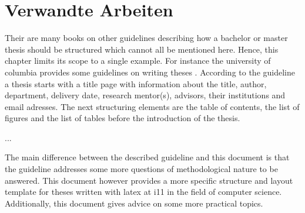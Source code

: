 
\chapter{Verwandte Arbeiten}
\label{sect:relatedWork}



Their are many books on other guidelines describing how a bachelor or master thesis should be structured which cannot all be mentioned here.
Hence, this chapter limits its scope to a single example.
For instance the university of columbia provides some guidelines on writing theses \cite{columbia}.
According to the guideline a thesis starts with a title page with information about the title, author, department, delivery date, research mentor(s), advisors, their institutions and email adresses.
The next structuring elements are the table of contents, the list of figures and the list of tables before the introduction of the thesis.

...

The main difference between the described guideline and this document is that the guideline addresses some more questions of methodological nature to be answered.
This document however provides a more specific structure and layout template for theses written with latex at i11 in the field of computer science.
Additionally, this document gives advice on some more practical topics.
